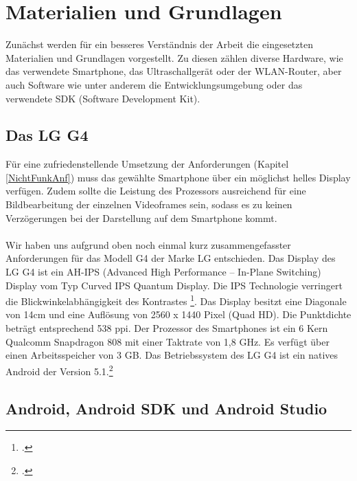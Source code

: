 \chapter{Materialien und Grundlagen}

Zunächst werden für ein besseres Verständnis der Arbeit die eingesetzten Materialien und Grundlagen vorgestellt. Zu diesen zählen diverse Hardware, wie das verwendete Smartphone, das Ultraschallgerät oder der WLAN-Router, aber auch Software wie unter anderem die Entwicklungsumgebung oder das verwendete SDK (Software Development Kit). 

\section{Das LG G4} \label{LGG4}

Für eine zufriedenstellende Umsetzung der Anforderungen (Kapitel \ref{NichtFunkAnf}) muss das gewählte Smartphone über ein möglichst helles Display verfügen. Zudem sollte die Leistung des Prozessors ausreichend für eine Bildbearbeitung der einzelnen Videoframes sein, sodass es zu keinen Verzögerungen bei der Darstellung auf dem Smartphone kommt.
\\ 
\\
Wir haben uns aufgrund oben noch einmal kurz zusammengefasster Anforderungen für das Modell G4 der Marke LG entschieden.  Das Display des LG G4 ist ein AH-IPS (Advanced High Performance – In-Plane Switching) Display vom Typ Curved IPS Quantum Display. Die IPS Technologie verringert die Blickwinkelabhängigkeit des Kontrastes \footcite{LC-Schirme}. Das Display besitzt eine Diagonale von 14cm und eine Auflösung von 2560 x 1440 Pixel (Quad HD). Die Punktdichte beträgt entsprechend 538 ppi. Der Prozessor des Smartphones ist ein 6 Kern Qualcomm Snapdragon 808 mit einer Taktrate von 1,8 GHz. Es verfügt über einen Arbeitsspeicher von 3 GB. Das Betriebssystem des LG G4 ist ein natives Android der Version 5.1.\footcite{LGG4} 

\section{Android, Android SDK und Android Studio} \label{Android}

